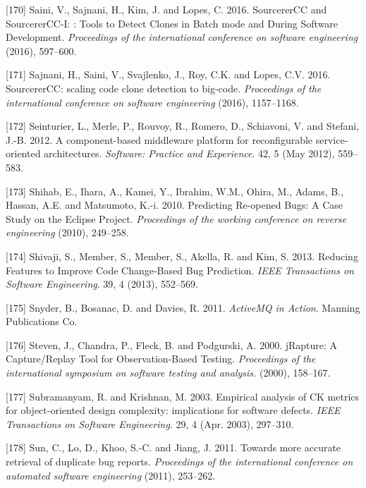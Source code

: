 \documentclass[12pt]{report}
\begin{document}
\hypertarget{ref-Saini2016}{}
{[}170{]} Saini, V., Sajnani, H., Kim, J. and Lopes, C. 2016.
SourcererCC and SourcererCC-I: : Tools to Detect Clones in Batch mode
and During Software Development. \emph{Proceedings of the international
conference on software engineering} (2016), 597--600.

\hypertarget{ref-Sajnani2016}{}
{[}171{]} Sajnani, H., Saini, V., Svajlenko, J., Roy, C.K. and Lopes,
C.V. 2016. SourcererCC: scaling code clone detection to big-code.
\emph{Proceedings of the international conference on software
engineering} (2016), 1157--1168.

\hypertarget{ref-Seinturier2012}{}
{[}172{]} Seinturier, L., Merle, P., Rouvoy, R., Romero, D., Schiavoni,
V. and Stefani, J.-B. 2012. A component-based middleware platform for
reconfigurable service-oriented architectures. \emph{Software: Practice
and Experience}. 42, 5 (May 2012), 559--583.

\hypertarget{ref-Shihab2010}{}
{[}173{]} Shihab, E., Ihara, A., Kamei, Y., Ibrahim, W.M., Ohira, M.,
Adams, B., Hassan, A.E. and Matsumoto, K.-i. 2010. Predicting Re-opened
Bugs: A Case Study on the Eclipse Project. \emph{Proceedings of the
working conference on reverse engineering} (2010), 249--258.

\hypertarget{ref-Shivaji2013}{}
{[}174{]} Shivaji, S., Member, S., Member, S., Akella, R. and Kim, S.
2013. Reducing Features to Improve Code Change-Based Bug Prediction.
\emph{IEEE Transactions on Software Engineering}. 39, 4 (2013),
552--569.

\hypertarget{ref-snyder2011activemq}{}
{[}175{]} Snyder, B., Bosanac, D. and Davies, R. 2011. \emph{ActiveMQ in
Action}. Manning Publications Co.

\hypertarget{ref-Steven2000}{}
{[}176{]} Steven, J., Chandra, P., Fleck, B. and Podgurski, A. 2000.
jRapture: A Capture/Replay Tool for Observation-Based Testing.
\emph{Proceedings of the international symposium on software testing and
analysis.} (2000), 158--167.

\hypertarget{ref-Subramanyam2003}{}
{[}177{]} Subramanyam, R. and Krishnan, M. 2003. Empirical analysis of
CK metrics for object-oriented design complexity: implications for
software defects. \emph{IEEE Transactions on Software Engineering}. 29,
4 (Apr. 2003), 297--310.

\hypertarget{ref-Sun2011}{}
{[}178{]} Sun, C., Lo, D., Khoo, S.-C. and Jiang, J. 2011. Towards more
accurate retrieval of duplicate bug reports. \emph{Proceedings of the
international conference on automated software engineering} (2011),
253--262.
\end{document}
